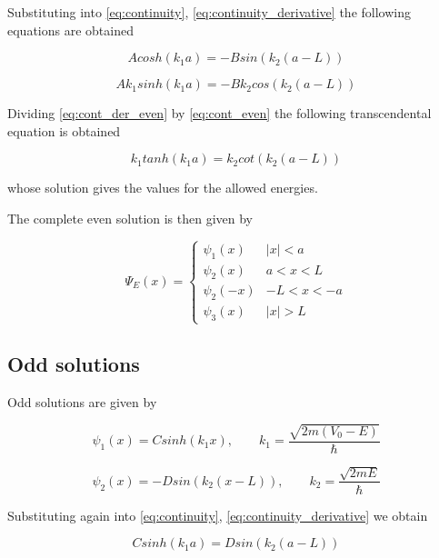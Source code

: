 \documentclass{article}
\begin{document}
Substituting into \eqref{eq:continuity}, \eqref{eq:continuity_derivative} the following equations are obtained

\begin{equation}
\label{eq:cont_even}
A cosh(k_{1}a) =  - B sin(k_{2}(a-L))
\end{equation}

\begin{equation}
\label{eq:cont_der_even}
A k_{1} sinh(k_{1}a) = - B k_{2} cos(k_{2}(a-L))
\end{equation}

Dividing \eqref{eq:cont_der_even} by \eqref{eq:cont_even} the following transcendental equation is obtained

\begin{equation}
\label{eq:trans_even}
k_{1} tanh(k_{1}a) = k_{2} cot(k_{2}(a-L))
\end{equation}

whose solution gives the values for the allowed energies.

The complete even solution is then given by

\begin{equation}
\Psi_{E}(x) = 
  \begin{cases} 
      \psi_{1}(x) & \left|x\right| < a \\
      \psi_{2}(x) & a < x < L \\
      \psi_{2}(-x) & -L < x < -a \\
      \psi_{3}(x) & \left|x\right| > L
   \end{cases}
\end{equation}

\subsection{Odd solutions}
Odd solutions are given by

\begin{equation}
\psi_{1}(x) = C sinh(k_{1} x), \qquad k_{1} = \frac{\sqrt{2m(V_{0} - E)}}{\hbar}
\end{equation}

\begin{equation}
\psi_{2}(x) = - D sin(k_{2}(x-L)), \qquad k_{2} = \frac{\sqrt{2mE}}{\hbar}
\end{equation}

Substituting again into \eqref{eq:continuity}, \eqref{eq:continuity_derivative} we obtain

\begin{equation}
\label{eq:cont_odd}
C sinh(k_{1}a) =  D sin(k_{2}(a-L))
\end{equation}
\end{document}
